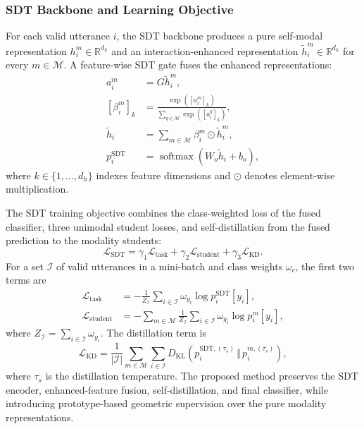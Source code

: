\documentclass[letterpaper,journal]{IEEEtran}
\begin{document}
\subsubsection{SDT Backbone and Learning Objective}

For each valid utterance \(i\), the SDT backbone produces a pure self-modal
representation \(h_i^m\in\mathbb{R}^{d_h}\) and an
interaction-enhanced representation
\(\widetilde h_i^m\in\mathbb{R}^{d_h}\) for every
\(m\in\mathcal{M}\). A feature-wise SDT gate fuses the enhanced
representations:
\begin{align}
    a_i^m &= G\widetilde h_i^m,
    \label{eq:rgrpl_sdt_gate_score}\\
    [\beta_i^m]_k
    &=\frac{\exp([a_i^m]_k)}
    {\sum_{q\in\mathcal{M}}\exp([a_i^q]_k)},
    \label{eq:rgrpl_sdt_gate}\\
    \widetilde h_i
    &=\sum_{m\in\mathcal{M}}\beta_i^m\odot\widetilde h_i^m,
    \label{eq:rgrpl_sdt_fusion}\\
    p_i^{\mathrm{SDT}}
    &=\operatorname{softmax}(W_o\widetilde h_i+b_o),
    \label{eq:rgrpl_sdt_output}
\end{align}
where \(k\in\{1,\ldots,d_h\}\) indexes feature dimensions and \(\odot\)
denotes element-wise multiplication.

The SDT training objective combines the class-weighted loss of the fused
classifier, three unimodal student losses, and self-distillation from the
fused prediction to the modality students:
\begin{equation}
    \mathcal{L}_{\mathrm{SDT}}
    =\gamma_1\mathcal{L}_{\mathrm{task}}
    +\gamma_2\mathcal{L}_{\mathrm{student}}
    +\gamma_3\mathcal{L}_{\mathrm{KD}}.
    \label{eq:rgrpl_sdt_objective}
\end{equation}
For a set \(\mathcal{I}\) of valid utterances in a mini-batch and class
weights \(\omega_c\), the first two terms are
\begin{align}
    \mathcal{L}_{\mathrm{task}}
    &=-\frac{1}{Z_{\mathcal{I}}}
    \sum_{i\in\mathcal{I}}\omega_{y_i}
    \log p_i^{\mathrm{SDT}}[y_i],
    \label{eq:rgrpl_task_loss}\\
    \mathcal{L}_{\mathrm{student}}
    &=-\sum_{m\in\mathcal{M}}\frac{1}{Z_{\mathcal{I}}}
    \sum_{i\in\mathcal{I}}\omega_{y_i}\log p_i^m[y_i],
    \label{eq:rgrpl_student_loss}
\end{align}
where
\(Z_{\mathcal{I}}=\sum_{i\in\mathcal{I}}\omega_{y_i}\).
The distillation term is
\begin{equation}
    \mathcal{L}_{\mathrm{KD}}
    =\frac{1}{|\mathcal{I}|}
    \sum_{m\in\mathcal{M}}\sum_{i\in\mathcal{I}}
    D_{\mathrm{KL}}\!\left(
    p_i^{\mathrm{SDT},(\tau_s)}
    \,\Vert\,p_i^{m,(\tau_s)}\right),
    \label{eq:rgrpl_kd_loss}
\end{equation}
where \(\tau_s\) is the distillation temperature. The proposed method
preserves the SDT encoder, enhanced-feature fusion, self-distillation, and
final classifier, while introducing prototype-based geometric supervision
over the pure modality representations.
\end{document}
